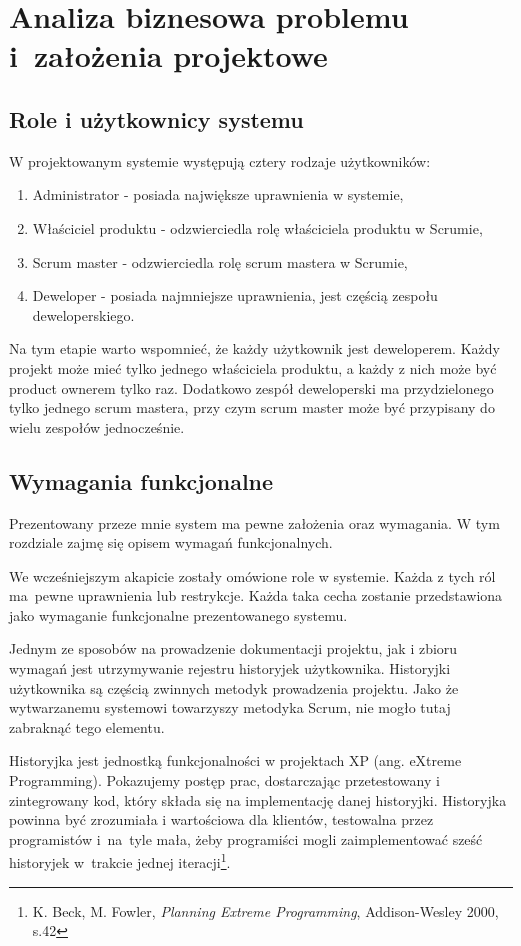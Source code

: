 \chapter{Analiza biznesowa problemu i~założenia projektowe}

\section{Role i użytkownicy systemu}
W projektowanym systemie występują cztery rodzaje użytkowników:

\begin{enumerate}
	\item Administrator - posiada największe uprawnienia w systemie,
	\item Właściciel produktu - odzwierciedla rolę właściciela produktu w Scrumie,
	\item Scrum master - odzwierciedla rolę scrum mastera w Scrumie,
	\item Deweloper - posiada najmniejsze uprawnienia, jest częścią zespołu deweloperskiego.
\end{enumerate} 

Na tym etapie warto wspomnieć, że każdy użytkownik jest deweloperem. Każdy projekt może mieć tylko jednego właściciela produktu, a każdy z nich może być product ownerem tylko raz. Dodatkowo zespół deweloperski ma przydzielonego tylko jednego scrum mastera, przy czym scrum master może być przypisany do wielu zespołów jednocześnie.

\section{Wymagania funkcjonalne}
Prezentowany przeze mnie system ma pewne założenia oraz wymagania. W tym rozdziale zajmę się opisem wymagań funkcjonalnych. 

We wcześniejszym akapicie zostały omówione role w systemie. Każda z tych ról ma~pewne uprawnienia lub restrykcje. Każda taka cecha zostanie przedstawiona jako wymaganie funkcjonalne prezentowanego systemu.

Jednym ze sposobów na prowadzenie dokumentacji projektu, jak i zbioru wymagań jest utrzymywanie rejestru historyjek użytkownika. Historyjki użytkownika są częścią zwinnych metodyk prowadzenia projektu. Jako że wytwarzanemu systemowi towarzyszy metodyka Scrum, nie mogło tutaj zabraknąć tego elementu.

\begin{italicquote}
	Historyjka jest jednostką funkcjonalności w projektach XP (ang. eXtreme Programming). Pokazujemy postęp prac, dostarczając przetestowany i zintegrowany kod, który składa się na implementację danej historyjki. Historyjka powinna być zrozumiała i wartościowa dla klientów, testowalna przez programistów i~na~tyle mała, żeby programiści mogli zaimplementować sześć historyjek w~trakcie jednej iteracji\footnote{K. Beck, M. Fowler, \textit{Planning Extreme Programming}, Addison-Wesley 2000, s.42}.
\end{italicquote}

